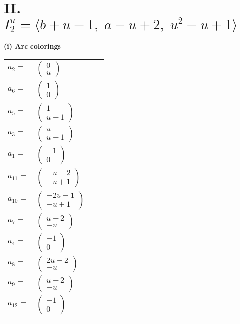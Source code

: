 \documentclass[1p]{elsarticle_modified}
\theoremstyle{definition}
\begin{document}
\centering \section*{II. $I^u_{2}= \langle b+u-1,\;a+u+2,\;u^2- u+1 \rangle$}
\flushleft \textbf{(i) Arc colorings}\\
\begin{tabular}{m{7pt} m{180pt} m{7pt} m{180pt} }
\flushright $a_{2}=$&$\begin{pmatrix}0\\u\end{pmatrix}$ \\
\flushright $a_{6}=$&$\begin{pmatrix}1\\0\end{pmatrix}$ \\
\flushright $a_{5}=$&$\begin{pmatrix}1\\u-1\end{pmatrix}$ \\
\flushright $a_{3}=$&$\begin{pmatrix}u\\u-1\end{pmatrix}$ \\
\flushright $a_{1}=$&$\begin{pmatrix}-1\\0\end{pmatrix}$ \\
\flushright $a_{11}=$&$\begin{pmatrix}- u-2\\- u+1\end{pmatrix}$ \\
\flushright $a_{10}=$&$\begin{pmatrix}-2 u-1\\- u+1\end{pmatrix}$ \\
\flushright $a_{7}=$&$\begin{pmatrix}u-2\\- u\end{pmatrix}$ \\
\flushright $a_{4}=$&$\begin{pmatrix}-1\\0\end{pmatrix}$ \\
\flushright $a_{8}=$&$\begin{pmatrix}2 u-2\\- u\end{pmatrix}$ \\
\flushright $a_{9}=$&$\begin{pmatrix}u-2\\- u\end{pmatrix}$ \\
\flushright $a_{12}=$&$\begin{pmatrix}-1\\0\end{pmatrix}$\\&\end{tabular}
\end{document}
